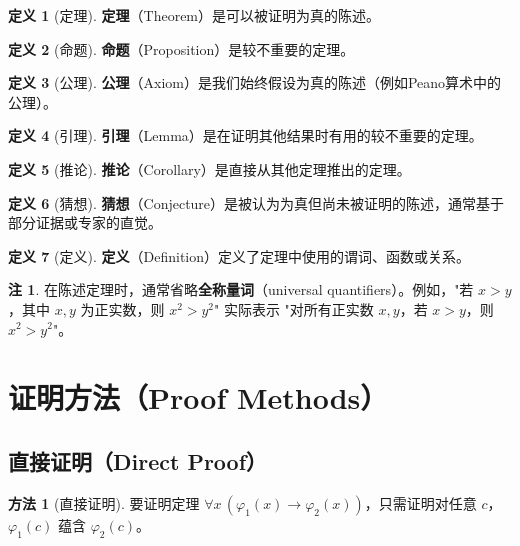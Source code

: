 \documentclass[UTF8,11pt,a4paper]{ctexbook}   %
\theoremstyle{definition}
\newtheorem{definition}{定义}[section]
\newtheorem{remark}{注}[section]
\newtheorem{method}{方法}[section]
\begin{document}
\begin{definition}[定理]
\textbf{定理}（Theorem）是可以被证明为真的陈述。
\end{definition}

\begin{definition}[命题]
\textbf{命题}（Proposition）是较不重要的定理。
\end{definition}

\begin{definition}[公理]
\textbf{公理}（Axiom）是我们始终假设为真的陈述（例如Peano算术中的公理）。
\end{definition}

\begin{definition}[引理]
\textbf{引理}（Lemma）是在证明其他结果时有用的较不重要的定理。
\end{definition}

\begin{definition}[推论]
\textbf{推论}（Corollary）是直接从其他定理推出的定理。
\end{definition}

\begin{definition}[猜想]
\textbf{猜想}（Conjecture）是被认为为真但尚未被证明的陈述，通常基于部分证据或专家的直觉。
\end{definition}

\begin{definition}[定义]
\textbf{定义}（Definition）定义了定理中使用的谓词、函数或关系。
\end{definition}

\begin{remark}
在陈述定理时，通常省略\textbf{全称量词}（universal quantifiers）。例如，"若 $x > y$，其中 $x,y$ 为正实数，则 $x^2 > y^2$" 实际表示 "对所有正实数 $x,y$，若 $x > y$，则 $x^2 > y^2$"。
\end{remark}

\section{证明方法（Proof Methods）}

\subsection{直接证明（Direct Proof）}

\begin{method}[直接证明]
要证明定理 $\forall x\,(\varphi_1(x) \to \varphi_2(x))$，只需证明对任意 $c$，$\varphi_1(c)$ 蕴含 $\varphi_2(c)$。
\end{method}
\end{document}
